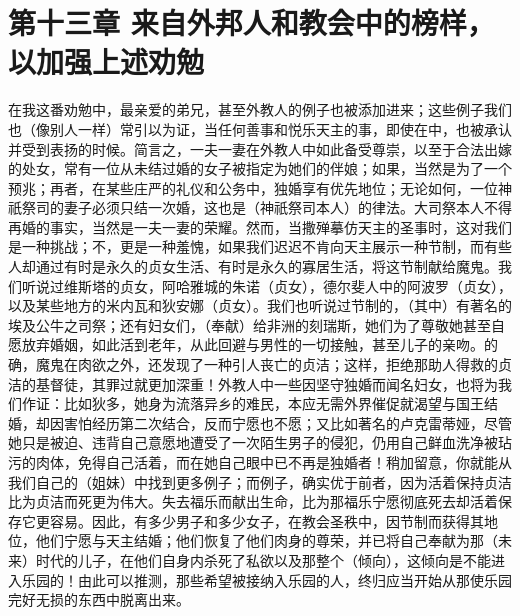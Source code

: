 \section{第十三章 来自外邦人和教会中的榜样，以加强上述劝勉}

在我这番劝勉中，最亲爱的弟兄，甚至外教人的例子也被添加进来；这些例子我们也（像别人一样）常引以为证，当任何善事和悦乐天主的事，即使在中，也被承认并受到表扬的时候。简言之，一夫一妻在外教人中如此备受尊崇，以至于合法出嫁的处女，常有一位从未结过婚的女子被指定为她们的伴娘；如果，当然是为了一个预兆；再者，在某些庄严的礼仪和公务中，独婚享有优先地位；无论如何，一位神祇祭司的妻子必须只结一次婚，这也是（神祇祭司本人）的律法。大司祭本人不得再婚的事实，当然是一夫一妻的荣耀。然而，当撒殚摹仿天主的圣事时，这对我们是一种挑战；不，更是一种羞愧，如果我们迟迟不肯向天主展示一种节制，而有些人却通过有时是永久的贞女生活、有时是永久的寡居生活，将这节制献给魔鬼。我们听说过维斯塔的贞女，阿哈雅城的朱诺（贞女），德尔斐人中的阿波罗（贞女），以及某些地方的米内瓦和狄安娜（贞女）。我们也听说过节制的，（其中）有著名的埃及公牛之司祭；还有妇女们，（奉献）给非洲的刻瑞斯，她们为了尊敬她甚至自愿放弃婚姻，如此活到老年，从此回避与男性的一切接触，甚至儿子的亲吻。的确，魔鬼在肉欲之外，还发现了一种引人丧亡的贞洁；这样，拒绝那助人得救的贞洁的基督徒，其罪过就更加深重！外教人中一些因坚守独婚而闻名妇女，也将为我们作证：比如狄多，她身为流落异乡的难民，本应无需外界催促就渴望与国王结婚，却因害怕经历第二次结合，反而宁愿也不愿；又比如著名的卢克雷蒂娅，尽管她只是被迫、违背自己意愿地遭受了一次陌生男子的侵犯，仍用自己鲜血洗净被玷污的肉体，免得自己活着，而在她自己眼中已不再是独婚者！稍加留意，你就能从我们自己的（姐妹）中找到更多例子；而例子，确实优于前者，因为活着保持贞洁比为贞洁而死更为伟大。失去福乐而献出生命，比为那福乐宁愿彻底死去却活着保存它更容易。因此，有多少男子和多少女子，在教会圣秩中，因节制而获得其地位，他们宁愿与天主结婚；他们恢复了他们肉身的尊荣，并已将自己奉献为那（未来）时代的儿子，在他们自身内杀死了私欲以及那整个（倾向），这倾向是不能进入乐园的！由此可以推测，那些希望被接纳入乐园的人，终归应当开始从那使乐园完好无损的东西中脱离出来。\par


